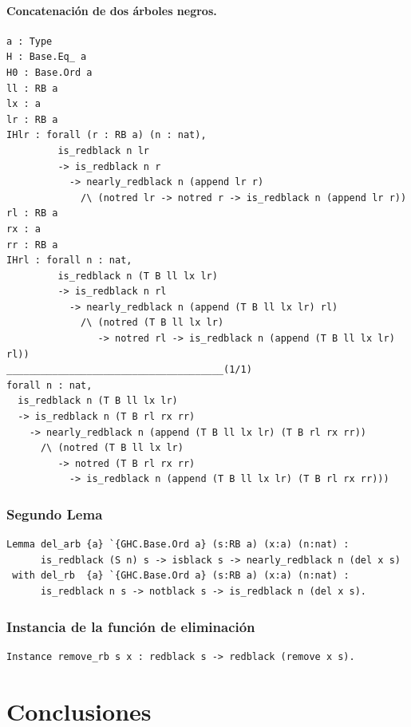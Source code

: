 \documentclass[8pt,leqno,pdflatex,spanish]{book}
\theoremstyle{plain}
\theoremstyle{definition}
\theoremstyle{remark}
\begin{document}
\subsubsection{Concatenaci\'on de dos \'arboles negros.} 
\begin{verbatim}
a : Type
H : Base.Eq_ a
H0 : Base.Ord a
ll : RB a
lx : a
lr : RB a
IHlr : forall (r : RB a) (n : nat),
         is_redblack n lr
         -> is_redblack n r
           -> nearly_redblack n (append lr r)
             /\ (notred lr -> notred r -> is_redblack n (append lr r))
rl : RB a
rx : a
rr : RB a
IHrl : forall n : nat,
         is_redblack n (T B ll lx lr)
         -> is_redblack n rl
           -> nearly_redblack n (append (T B ll lx lr) rl)
             /\ (notred (T B ll lx lr)
                -> notred rl -> is_redblack n (append (T B ll lx lr) rl))
______________________________________(1/1)
forall n : nat,
  is_redblack n (T B ll lx lr)
  -> is_redblack n (T B rl rx rr)
    -> nearly_redblack n (append (T B ll lx lr) (T B rl rx rr))
      /\ (notred (T B ll lx lr)
         -> notred (T B rl rx rr)
           -> is_redblack n (append (T B ll lx lr) (T B rl rx rr)))
\end{verbatim}
\subsection{Segundo Lema}
\begin{verbatim}
Lemma del_arb {a} `{GHC.Base.Ord a} (s:RB a) (x:a) (n:nat) :
      is_redblack (S n) s -> isblack s -> nearly_redblack n (del x s)
 with del_rb  {a} `{GHC.Base.Ord a} (s:RB a) (x:a) (n:nat) :
      is_redblack n s -> notblack s -> is_redblack n (del x s).
\end{verbatim}

\subsection{Instancia de la funci\'on de eliminaci\'on}
\begin{verbatim}
Instance remove_rb s x : redblack s -> redblack (remove x s).
\end{verbatim}
\chapter{Conclusiones}  

 
\backmatter%
\end{document}

